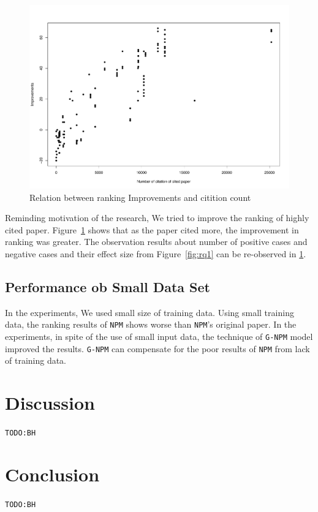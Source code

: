 \documentclass{llncs}
\newcommand{\name}{\texttt{G-NPM}\xspace}
\newcommand{\npm}{\texttt{NPM}\xspace}
\newcommand{\todo}[1]{\texttt{\color{red}TODO:#1}}
\begin{document}
\begin{figure}[ht]
\centering
\includegraphics[width= \textwidth]{rq1_2.pdf}
\caption{Relation between ranking Improvements and citition count \label{fig:rq1_2}}
\end{figure}

Reminding motivation of the research, We tried to improve the ranking of highly cited paper. Figure~\ref{fig:rq1_2} shows that as the paper cited more, the improvement in ranking was greater.  The observation results about number of positive cases and negative cases and their effect size from Figure~\ref{fig:rq1}  can be re-observed in  \ref{fig:rq1_2}.


\subsection{Performance ob Small Data Set}

In the experiments, We used small size of training data. Using small training data, the ranking results of \npm shows worse than \npm's original paper\cite{Huang:2015:NPM:2886521.2886655}. In the experiments, in spite of the use of small input data, the technique of \name model improved the results. \name can compensate for the poor results  of \npm from lack of training data.


\section{Discussion}
\todo{BH}

\section{Conclusion}
\label{sec:Conclusion}
\todo{BH}




\end{document}
